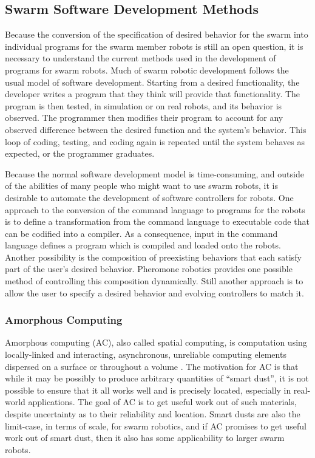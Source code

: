 \subsection{Swarm Software Development Methods}

Because the conversion of the specification of desired behavior for the swarm into individual programs for the swarm member robots is still an open question, it is necessary to understand the current methods used in the development of programs for swarm robots. 
Much of swarm robotic development follows the usual model of software development. 
Starting from a desired functionality, the developer writes a program that they think will provide that functionality.
The program is then tested, in simulation or on real robots, and its behavior is observed. 
The programmer then modifies their program to account for any observed difference between the desired function and the system's behavior. 
This loop of coding, testing, and coding again is repeated until the system behaves as expected, or the programmer graduates. 

Because the normal software development model is time-consuming, and outside of the abilities of many people who might want to use swarm robots, it is desirable to automate the development of software controllers for robots. 
One approach to the conversion of the command language to programs for the robots is to define a transformation from the command language to executable code that can be codified into a compiler. 
As a consequence, input in the command language defines a program which is compiled and loaded onto the robots. 
Another possibility is the composition of preexisting behaviors that each satisfy part of the user's desired behavior. 
Pheromone robotics provides one possible method of controlling this composition dynamically. 
Still another approach is to allow the user to specify a desired behavior and evolving controllers to match it. 

\subsubsection{Amorphous Computing}

Amorphous computing (AC), also called spatial computing, is computation using locally-linked and interacting, asynchronous, unreliable computing elements dispersed on a surface or throughout a volume \cite{abelson2000amorphous}. 
The motivation for AC is that while it may be possibly to produce arbitrary quantities of ``smart dust'', it is not possible to ensure that it all works well and is precisely located, especially in real-world applications.
The goal of AC is to get useful work out of such materials, despite uncertainty as to their reliability and location. 
Smart dusts are also the limit-case, in terms of scale, for swarm robotics, and if AC promises to get useful work out of smart dust, then it also has some applicability to larger swarm robots.

